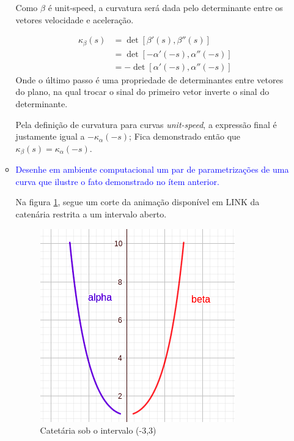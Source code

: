 \documentclass[12pt,letterpaper]{article}
\begin{document}
\begin{enumerate}
\begin{itemize}
		Como $\beta$ é unit-speed, a curvatura será dada pelo determinante entre os vetores velocidade e aceleração.
		
		\begin{align*}
			\kappa_{\beta}(s)&=\det[\beta'(s),\beta''(s)]\\
			&=\det[-\alpha'(-s),\alpha''(-s)]\\
			&=-\det[\alpha'(-s),\alpha''(-s)]
			\end{align*}
		Onde o último passo é uma propriedade de determinantes entre vetores do plano, na qual trocar o sinal do primeiro vetor inverte o sinal do determinante.
		
		Pela definição de curvatura para curvas \textit{unit-speed}, a expressão final é justamente igual a $-\kappa_{\alpha}(-s)$; Fica demonstrado então que $\kappa_{\beta}(s)=\kappa_{\alpha}(-s)$.
		
		\item \textcolor{blue}{Desenhe em ambiente computacional um par de parametrizações de uma curva que ilustre o fato demonstrado no ítem anterior.}
		
		Na figura \ref{ex3}, segue um corte da animação disponível em \LARGE{LINK} da catenária restrita a um intervalo aberto.
		
		\begin{figure}
			\centering
			\includegraphics[scale=0.7]{../images/L3_ex3.png}
			\caption{Catetária sob o intervalo (-3,3)}
			\label{ex3}
		\end{figure}
		
		\end{itemize}
		
		
		
		
	\end{enumerate}
	
	\newpage
	
	
	
\end{document}
